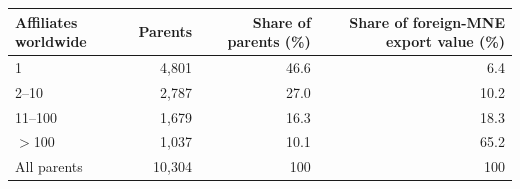 \begin{tabular}{lrrr}
\toprule
Affiliates worldwide & Parents & Share of parents (\%) & Share of foreign-MNE export value (\%) \\
\midrule
1 & 4,801 & 46.6 & 6.4 \\
2--10 & 2,787 & 27.0 & 10.2 \\
11--100 & 1,679 & 16.3 & 18.3 \\
$>$100 & 1,037 & 10.1 & 65.2 \\
\midrule
All parents & 10,304 & 100 & 100 \\
\bottomrule
\end{tabular}
